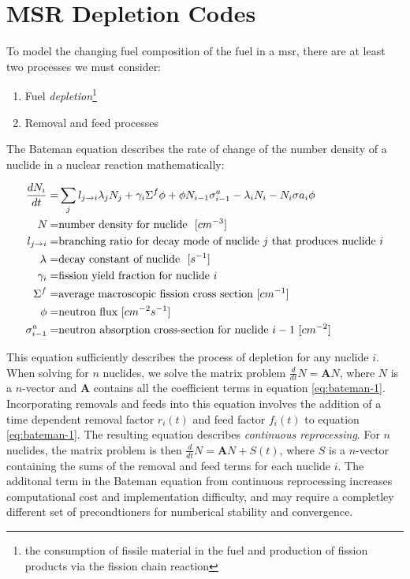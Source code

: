 \section{MSR Depletion Codes}%
\label{sec:msr_codes}

To model the changing fuel composition of the fuel in a \Gls{msr}, there are at least two processes we must consider:
\begin{enumerate}
    \item Fuel {\it depletion}\footnote{the consumption of fissile material in the fuel and production of fission products via the fission chain reaction}
    \item Removal and feed processes
\end{enumerate}

The Bateman equation describes the rate of change of the number density of a nuclide in a nuclear reaction mathematically:

\begin{align}
    \label{eq:bateman-1}
    \frac{dN_{i}}{dt} =& \sum_{j} l_{j\to i}\lambda_{j} N_{j} + \gamma_{i} \Sigma^{f}\phi + \phi N_{i-1} \sigma^{a}_{i-1} - \lambda_{i}N_{i} - N_{i}\sigma{a}_{i}\phi\\
    N_{\*} =& \text{number density for nuclide $\*$ $[cm^{-3}]$}\nonumber\\
    l_{j\to i} =& \text{branching ratio for decay mode of nuclide $j$ that produces nuclide $i$}\nonumber\\
    \lambda_{\*} =& \text{decay constant of nuclide $\*$ $[s^{-1}]$}\nonumber\\
    \gamma_{i} =& \text{fission yield fraction for nuclide $i$}\nonumber \\
    \Sigma^{f} =& \text{average macroscopic fission cross section $[cm^{-1}]$}\nonumber\\
    \phi =& \text{neutron flux $[cm^{-2}s^{-1}]$}\nonumber\\
    \sigma^{a}_{i-1} =& \text{neutron absorption cross-section for nuclide $i-1$ $[cm^{-2}]$}\nonumber\\
\end{align}
    
This equation sufficiently describes the process of depletion for any nuclide $i$. When solving for $n$ nuclides, we solve the matrix problem $\frac{d}{dt}N = \mathbf{A}N$, where $N$ is a $n$-vector and $\mathbf{A}$ contains all the coefficient terms in equation \ref{eq:bateman-1}. Incorporating removals and feeds into this equation involves the addition of a time dependent removal factor $r_{i}(t)$ and feed factor $f_{i}(t)$ to equation \ref{eq:bateman-1}. The resulting equation describes {\it continuous reprocessing}.
For $n$ nuclides, the matrix problem is then $\frac{d}{dt}N = \mathbf{A}N + S(t)$, where $S$ is a $n$-vector containing the sums of the removal and feed terms for each nuclide $i$. The additonal term in the Bateman equation from continuous reprocessing increases computational cost and implementation difficulty, and may require a completley different set of precondtioners for numberical stability and convergence.

